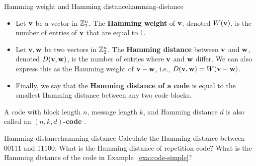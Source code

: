 \begin{definition}{Hamming weight and Hamming distance}{hamming-distance}
  \begin{itemize}
  \item Let $\mbox{\bf v}$ be a vector in $\mathbb{Z}_2^n$. The \textbf{Hamming
      weight}%
     of\/ $\mbox{\bf v}$,
    denoted $W(\mbox{\bf v})$, is the number of entries of\/ $\mbox{\bf v}$
    that are equal to 1.
  \item Let $\mbox{\bf v},\mbox{\bf w}$ be two vectors in $\mathbb{Z}_2^n$. The
    \textbf{Hamming distance}%
     between $\mbox{\bf v}$
    and $\mbox{\bf w}$, denoted $D(\mbox{\bf v},\mbox{\bf w})$, is the number of
    entries where $\mbox{\bf v}$ and $\mbox{\bf w}$ differ. We can also
    express this as the Hamming weight of\/ $\mbox{\bf v}-\mbox{\bf w}$, i.e.,
    $D(\mbox{\bf v},\mbox{\bf w})=W(\mbox{\bf v}-\mbox{\bf w})$.
  \item Finally, we say that the \textbf{Hamming distance of a code}
    is equal to the smallest Hamming distance between any two code
    blocks.
  \end{itemize}
  A code with block length $n$, message length $k$, and Hamming
  distance $d$ is also called an \textbf{$(n,k,d)$-code}%
  .
\end{definition}

\begin{example}{Hamming distance}{hamming-distance}
  Calculate the Hamming distance between $00111$ and $11100$. What is
  the Hamming distance of repetition code? What is the
  Hamming distance of the code in Example~\ref{exa:code-simple}?
\end{example}

